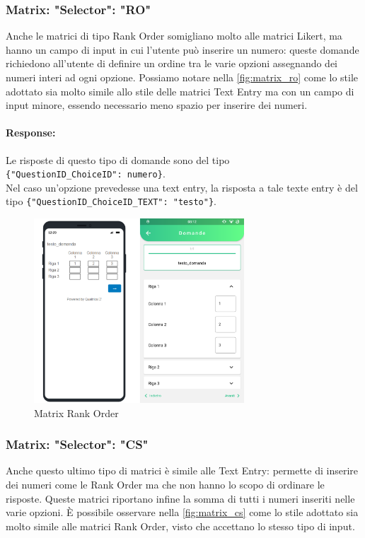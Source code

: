 \clearpage
\subsubsection{Matrix: "Selector": "RO"}
Anche le matrici di tipo Rank Order somigliano molto alle matrici Likert, ma hanno un campo di input in cui l'utente può inserire un numero: queste domande richiedono all'utente di definire un ordine tra le varie opzioni assegnando dei numeri interi ad ogni opzione. Possiamo notare nella \autoref{fig:matrix_ro} come lo stile adottato sia molto simile allo stile delle matrici Text Entry ma con un campo di input minore, essendo necessario meno spazio per inserire dei numeri.

\paragraph{Response:}
Le risposte di questo tipo di domande sono del tipo\\ \texttt{\{"QuestionID\_ChoiceID": numero\}}.\\Nel caso un'opzione prevedesse una text entry, la risposta a tale texte entry è del tipo \texttt{\{"QuestionID\_ChoiceID\_TEXT": "testo"\}}.

\begin{figure}[h!]
\centering
\includegraphics[width=0.7\textwidth]{img/matrix_ro}
\caption{Matrix Rank Order}
\label{fig:matrix_ro}
\end{figure}

\clearpage
\subsubsection{Matrix: "Selector": "CS"}
Anche questo ultimo tipo di matrici è simile alle Text Entry: permette di inserire dei numeri come le Rank Order ma che non hanno lo scopo di ordinare le risposte. Queste matrici riportano infine la somma di tutti i numeri inseriti nelle varie opzioni. È possibile osservare nella \autoref{fig:matrix_cs} come lo stile adottato sia molto simile alle matrici Rank Order, visto che accettano lo stesso tipo di input.

